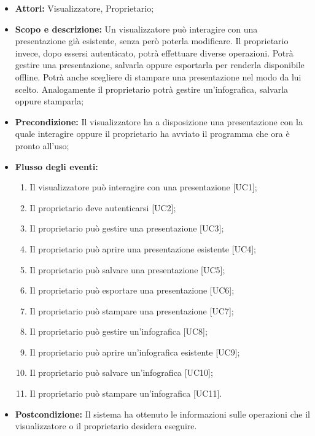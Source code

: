 \begin{itemize}
	\item \textbf{Attori:} Visualizzatore, Proprietario;
	\item \textbf{Scopo e descrizione:} Un visualizzatore può interagire con una presentazione già esistente, senza però poterla modificare. Il proprietario invece, dopo essersi autenticato, potrà effettuare diverse operazioni. Potrà gestire una presentazione, salvarla oppure esportarla per renderla disponibile offline. Potrà anche scegliere di stampare una presentazione nel modo da lui scelto. Analogamente il proprietario potrà gestire un'infografica, salvarla oppure stamparla;
	\item \textbf{Precondizione:} Il visualizzatore ha a disposizione una presentazione con la quale interagire oppure il proprietario ha avviato il programma che ora è pronto all'uso;
	\item \textbf{Flusso degli eventi:}
	\begin{enumerate}
		\item Il visualizzatore può interagire con una presentazione [UC1];
		\item Il proprietario deve autenticarsi [UC2];
		\item Il proprietario può gestire una presentazione [UC3];
		\item Il proprietario può aprire una presentazione esistente [UC4];
		\item Il proprietario può salvare una presentazione [UC5];
		\item Il proprietario può esportare una presentazione [UC6];
		\item Il proprietario può stampare una presentazione [UC7];
		\item Il proprietario può gestire un'infografica [UC8];
		\item Il proprietario può aprire un'infografica esistente [UC9];
		\item Il proprietario può salvare un'infografica [UC10];
		\item Il proprietario può stampare un'infografica [UC11].
	\end{enumerate}
	\item \textbf{Postcondizione:} Il sistema ha ottenuto le informazioni sulle operazioni che il visualizzatore o il proprietario desidera eseguire.
\end{itemize}






















